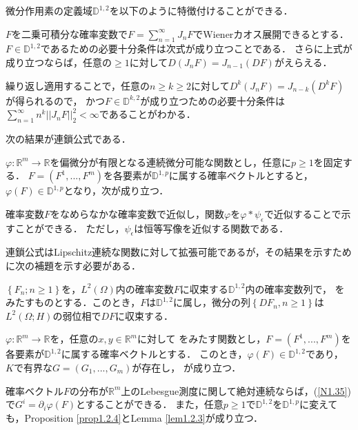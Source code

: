 微分作用素の定義域$\mathbb{D}^{1,2}$を以下のように特徴付けることができる．
\begin{proposition}\label{prop1.2.2}%
$F$を二乗可積分な確率変数で$F=\sum^\infty_{n=1}J_nF$でWienerカオス展開できるとする．
$F\in\mathbb{D}^{1,2}$であるための必要十分条件は次式が成り立つことである．
さらに上式が成り立つならば，任意の$\ge1$に対して$D(J_nF)=J_{n-1}(DF)$がえらえる．
\end{proposition}
繰り返し適用することで，任意の$n\ge k\ge2$に対して$D^k(J_nF)=J_{n-k}(D^kF)$が得られるので，
かつ$F\in\mathbb{D}^{k,2}$が成り立つための必要十分条件は$\sum^\infty_{n=1}n^k||J_nF||^2_2<\infty$であることがわかる．

次の結果が連鎖公式である．
\begin{proposition}\label{prop1.2.3}%
$\varphi:\mathbb{R}^m\rightarrow\mathbb{R}$を偏微分が有限となる連続微分可能な関数とし，任意に$p\ge1$を固定する．
$F=\left(F^1,...,F^m\right)$を各要素が$\mathbb{D}^{1,p}$に属する確率ベクトルとすると，$\varphi(F)\in\mathbb{D}^{1,p}$となり，次が成り立つ．
\end{proposition}
確率変数$F$をなめらなかな確率変数で近似し，関数$\varphi$を$\varphi*\psi_\epsilon$で近似することで示すことができる．
ただし，$\psi_\epsilon$は恒等写像を近似する関数である．

連鎖公式はLipschitz連続な関数に対して拡張可能であるが，その結果を示すために次の補題を示す必要がある．
\begin{lemma}\label{lem1.2.3}%
$\left\{F_n;n\ge1\right\}$を，$L^2(\Omega)$内の確率変数$F$に収束する$\mathbb{D}^{1,2}$内の確率変数列で，
をみたすものとする．このとき，$F$は$\mathbb{D}^{1,2}$に属し，微分の列$\left\{DF_n,n\ge1\right\}$は$L^2(\Omega;H)$の弱位相で$DF$に収束する．
\end{lemma}
\begin{proposition}\label{prop1.2.4}%
$\varphi:\mathbb{R}^m\rightarrow\mathbb{R}$を，任意の$x,y\in\mathbb{R}^m$に対して
をみたす関数とし，$F=(F^1,...,F^m)$を各要素が$\mathbb{D}^{1,2}$に属する確率ベクトルとする．
このとき，$\varphi(F)\in\mathbb{D}^{1,2}$であり，
$K$で有界な$G=(G_1,...,G_m)$が存在し，
が成り立つ．
\end{proposition}
確率ベクトル$F$の分布が$\mathbb{R}^m$上のLebesgue測度に関して絶対連続ならば，(\ref{N1.35})で$G^i=\partial_i\varphi(F)$とすることができる．
また，任意$p\ge1$で$\mathbb{D}^{1,2}$を$\mathbb{D}^{1,p}$に変えても，Proposition \ref{prop1.2.4}とLemma \ref{lem1.2.3}が成り立つ．


